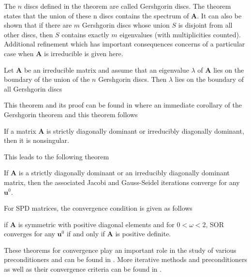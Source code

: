 The $n$ discs defined in the theorem are called Gershgorin discs. The theorem states that the union of these n discs contains the spectrum of $\boldsymbol{A}$. It can also be shown that if there are $m$ Gershgorin discs whose union $S$ is disjoint from all other discs, then $S$ contains exactly $m$ eigenvalues (with multiplicities counted). 
Additional refinement which has important consequences concerns of a particular case when $\boldsymbol{A}$ is irreducible is given here.
\begin{theorem}
Let $\boldsymbol{A}$ be an irreducible matrix and assume that an eigenvalue $\lambda$ of $\boldsymbol{A}$ lies on the boundary of the union of the $n$ Gershgorin discs. Then $\lambda$ lies on the boundary of all Gershgorin discs
\end{theorem}
This theorem and its proof can be found in \cite{doi:10.1137/1.9780898718003} where an immediate corollary of the Gershgorin theorem and this theorem follows
\begin{corollary}
If a matrix $\boldsymbol{A}$ is strictly diagonally dominant or irreducibly diagonally dominant, then it is nonsingular.
\end{corollary}
This leads to the following theorem
\begin{theorem}
If $\boldsymbol{A}$ is a strictly diagonally dominant or an irreducibly diagonally dominant matrix, then the associated Jacobi and Gauss-Seidel iterations converge for any $\boldsymbol{u}^0$.
\end{theorem}
For SPD matrices, the convergence condition is given as follows
\begin{theorem}
if $\boldsymbol{A}$ is symmetric with positive diagonal elements and for $0 < \omega < 2$, SOR converges for any $\boldsymbol{u}^0$ if and only if $\boldsymbol{A}$ is positive definite. 
\end{theorem}
These theorems for convergence play an important role in the study of various preconditioners and can be found in \cite{doi:10.1137/1.9780898718003}.
More iterative methods and preconditioners as well as their convergence criteria can be found in \cite{doi:10.1137/1.9780898718003}.
